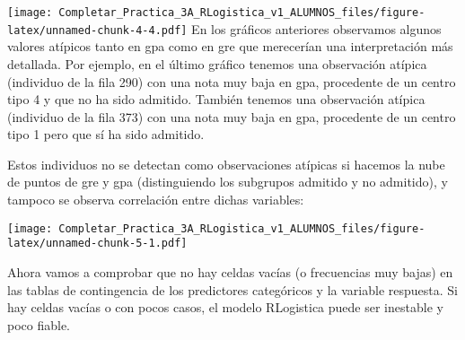 \documentclass[
]{article}
\newenvironment{Shaded}{\begin{snugshade}}{\end{snugshade}}
\newcommand{\AttributeTok}[1]{\textcolor[rgb]{0.13,0.29,0.53}{#1}}
\newcommand{\DecValTok}[1]{\textcolor[rgb]{0.00,0.00,0.81}{#1}}
\newcommand{\FunctionTok}[1]{\textcolor[rgb]{0.13,0.29,0.53}{\textbf{#1}}}
\newcommand{\NormalTok}[1]{#1}
\newcommand{\SpecialCharTok}[1]{\textcolor[rgb]{0.81,0.36,0.00}{\textbf{#1}}}
\newcommand{\StringTok}[1]{\textcolor[rgb]{0.31,0.60,0.02}{#1}}
\begin{document}
\texttt{[image: Completar\_Practica\_3A\_RLogistica\_v1\_ALUMNOS\_files/figure-latex/unnamed-chunk-4-4.pdf]}
En los gráficos anteriores observamos algunos valores atípicos tanto en
gpa como en gre que merecerían una interpretación más detallada. Por
ejemplo, en el último gráfico tenemos una observación atípica (individuo
de la fila 290) con una nota muy baja en gpa, procedente de un centro
tipo 4 y que no ha sido admitido. También tenemos una observación
atípica (individuo de la fila 373) con una nota muy baja en gpa,
procedente de un centro tipo 1 pero que sí ha sido admitido.

Estos individuos no se detectan como observaciones atípicas si hacemos
la nube de puntos de gre y gpa (distinguiendo los subgrupos admitido y
no admitido), y tampoco se observa correlación entre dichas variables:

\begin{Shaded}
\end{Shaded}

\texttt{[image: Completar\_Practica\_3A\_RLogistica\_v1\_ALUMNOS\_files/figure-latex/unnamed-chunk-5-1.pdf]}

Ahora vamos a comprobar que no hay celdas vacías (o frecuencias muy
bajas) en las tablas de contingencia de los predictores categóricos y la
variable respuesta. Si hay celdas vacías o con pocos casos, el modelo
RLogistica puede ser inestable y poco fiable.

\begin{Shaded}
\end{Shaded}
\end{document}
